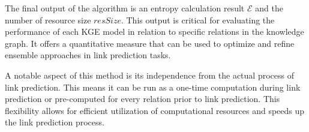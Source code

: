 \documentclass{article}
\begin{document}





The final output of the algorithm is an entropy calculation result \( \mathcal{E} \) and the number of resource size \( resSize \). This output is critical for evaluating the performance of each KGE model in relation to specific relations in the knowledge graph. It offers a quantitative measure that can be used to optimize and refine ensemble approaches in link prediction tasks.


A notable aspect of this method is its independence from the actual process of link prediction. This means it can be run as a one-time computation during link prediction or pre-computed for every relation prior to link prediction. This flexibility allows for efficient utilization of computational resources and speeds up the link prediction process.


\end{document}
